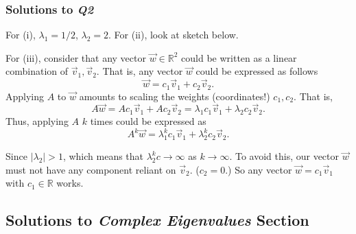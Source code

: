 \subsubsection{Solutions to \textit{Q2}}
	For (i), \(\lambda_1 = 1/2\), \(\lambda_2=2\). For (ii), look at sketch below.
	\begin{figure}[!h]
		\centering
	\end{figure}

	For (iii), consider that any vector \(\vec{w} \in \mathbb{R}^2\) could be written as a linear combination of \(\vec{v}_1, \vec{v}_2\). That is, any vector 
	\(\vec{w}\) could be expressed as follows \[\vec{w} = c_1\vec{v}_1 + c_2\vec{v}_2.\] Applying \(A\) to \(\vec{w}\) amounts to scaling the weights
	(coordinates!) \(c_1, c_2\). That is, \[A\vec{w} = Ac_1\vec{v}_1 + Ac_2\vec{v}_2 = \lambda_1c_1\vec{v}_1 + \lambda_2c_2\vec{v}_2.\]
	Thus, applying \(A\) \(k\) times could be expressed as \[A^k\vec{w} = \lambda_1^kc_1\vec{v}_1 + \lambda_2^kc_2\vec{v}_2.\]
	
	Since \(\lvert\lambda_2\rvert > 1\), which means that \(\lambda_2^kc \to \infty\) as \(k \to \infty\). To avoid this, our vector \(\vec{w}\) must not have
	any component reliant on \(\vec{v}_2\). (\(c_2 = 0\).) So any vector \(\vec{w} = c_1\vec{v}_1\) with \(c_1 \in \mathbb{R}\) works.

\subsection{Solutions to \textit{Complex Eigenvalues} Section}
